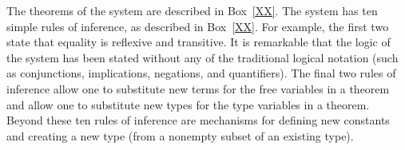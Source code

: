 \documentclass{llncs}
\begin{document}
The theorems of the system are described in Box~\ref{XX}.
The system has ten simple rules of inference, as described in Box~\ref{XX}.
For example, the first two state that equality is reflexive and transitive.
It is remarkable that the logic of the system has been stated without
any of the traditional logical notation (such as conjunctions, implications, negations, and quantifiers).
%
%
%
%
The final two rules
of inference allow one to substitute new terms for the free
variables in a theorem and  allow one to substitute new types for the
type variables in a theorem.  Beyond these ten rules of inference are mechanisms for
defining new constants and creating a new type (from a nonempty subset of an existing type).
\end{document}

